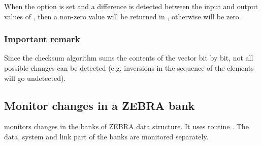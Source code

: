 When the  option is set and a difference is detected between the
input and output values of , then a non-zero value will be
returned in , otherwise  will be zero.

\subsubsection*{Important remark}

Since the checksum algorithm
sums the contents of the vector 
bit by bit, not all possible changes can be detected (e.g. inversions
in the sequence of the elements will go undetected).

\newpage

\subsection{Monitor changes in a ZEBRA bank}


\Action
{} monitors changes in the banks of ZEBRA data structure.
It uses routine .
The data, system and link part of the banks are monitored separately.

